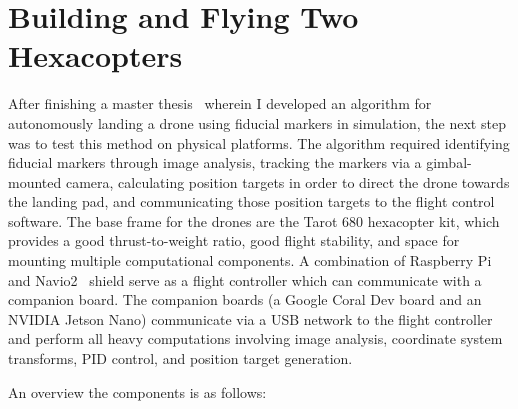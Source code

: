 \section{Building and Flying Two Hexacopters}
\label{section:initial_hexacopters}

After finishing a master thesis~\cite{joshua_master_thesis} wherein I developed an algorithm for autonomously landing a drone using
fiducial markers in simulation, the next step was to test this method on physical platforms.
The algorithm required identifying fiducial markers through image analysis,
tracking the markers via a gimbal-mounted camera,
calculating position targets in order to direct the drone towards the landing pad,
and communicating those position targets to the flight control software.
The base frame for the drones are the Tarot 680 hexacopter kit, which provides a good thrust-to-weight ratio,
good flight stability,
and space for mounting multiple computational components.
A combination of Raspberry Pi and Navio2~\cite{navio2_website} shield serve as a flight controller
which can communicate with a companion board.
The companion boards (a Google Coral Dev board and an NVIDIA Jetson Nano) communicate via a USB network to the flight
controller and perform all heavy computations involving image analysis, coordinate system transforms, PID control,
and position target generation.

An overview the components is as follows:


